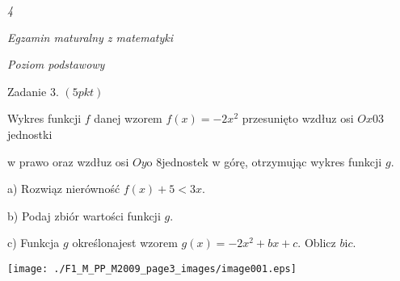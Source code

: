 \documentclass[a4paper,12pt]{article}
\begin{document}
{\it 4}

{\it Egzamin maturalny z matematyki}

{\it Poziom podstawowy}

Zadanie 3. $(5pkt)$

Wykres funkcji $f$ danej wzorem $f(x)=-2x^{2}$ przesunięto wzdłuz osi $Ox 0 3$ jednostki

w prawo oraz wzdłuz osi $Oy\mathrm{o}$ 8jednostek w górę, otrzymując wykres funkcji $g.$

a) Rozwiąz nierówność $f(x)+5<3x.$

b) Podaj zbiór wartości funkcji $g.$

c) Funkcja $g$ określonajest wzorem $g(x)=-2x^{2}+bx+c$. Oblicz $b\mathrm{i}c.$
\begin{center}
\texttt{[image: ./F1\_M\_PP\_M2009\_page3\_images/image001.eps]}
\end{center}
\end{document}
